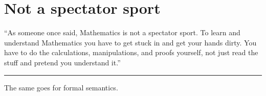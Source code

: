 \section*{Not a spectator sport}

%
``As someone once said, Mathematics is not a spectator sport. To learn and understand Mathematics you
have to get stuck in and get your hands dirty. You have to do the calculations,
manipulations, and proofs yourself, not just read the stuff and pretend you
understand it.''

\plainbreak{1}

The same goes for formal semantics.

\cleartooddpage

\tableofcontents*

\pagestyle{tufte-headings}

